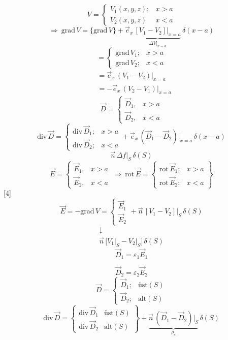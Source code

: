 \documentclass[11pt,a4paper]{article}
\begin{document}
\[
V=\begin{cases}V_1(x,y,z); & x>a\\ V_2(x,y,z) & x<a\end{cases}
\]
\[
\Rightarrow\ \mathrm{grad}\,V=\{\mathrm{grad}\,V\}+\vec e_x\,\underbrace{[V_1-V_2]\big|_{x=a}}_{\Delta V|_{x=a}}\,\delta(x-a)
\]
\[
=\begin{cases}\mathrm{grad}\,V_1; & x>a\\ \mathrm{grad}\,V_2; & x<a\end{cases}
\]
\[\begin{aligned}
&=\vec e_x\,(V_1-V_2)\big|_{x=a}\\
&=-\vec e_x\,(V_2-V_1)\big|_{x=a}
\end{aligned}\]
\[
\vec D=\begin{cases}\vec D_1, & x>a\\ \vec D_2, & x<a\end{cases}
\]
\[
\mathrm{div}\,\vec D=\begin{cases}\mathrm{div}\,\vec D_1; & x>a\\ \mathrm{div}\,\vec D_2; & x<a\end{cases}+\vec e_x\,(\vec D_1-\vec D_2)\big|_{x=a}\,\delta(x-a)
\]
\[
\vec n\,\Delta f\big|_S\,\delta(S)
\]
\[
\vec E=\begin{cases}\vec E_1, & x>a\\ \vec E_2, & x<a\end{cases}\ \Rightarrow\ \mathrm{rot}\,\vec E=\left\{\begin{array}{ll}\mathrm{rot}\,\vec E_1; & x>a\\ \mathrm{rot}\,\vec E_2; & x<a\end{array}\right\}
\]
[4]
\[
\vec E=-\mathrm{grad}\,V=\begin{cases}\vec E_1\\ \vec E_2\end{cases}+\vec n\,[V_1-V_2]\big|_S\,\delta(S)
\]
\[
\begin{gathered}\downarrow\\ \vec n\,\bigl[V_1\big|_S-V_2\big|_S\bigr]\,\delta(S)\end{gathered}
\]
\[
\vec D_1=\varepsilon_1\vec E_1
\]
\begin{center}
\end{center}
\[
\vec D_2=\varepsilon_2\vec E_2
\]
\[
\vec D=\begin{cases}\vec D_1; & \text{üst}(S)\\ \vec D_2; & \text{alt}(S)\end{cases}
\]
\[
\mathrm{div}\,\vec D=\left\{\begin{array}{ll}\mathrm{div}\,\vec D_1 & \text{üst}(S)\\ \mathrm{div}\,\vec D_2 & \text{alt}(S)\end{array}\right\}+\underbrace{\vec n\,(\vec D_1-\vec D_2)\big|_S}_{\rho_s}\,\delta(S)
\]
\end{document}
